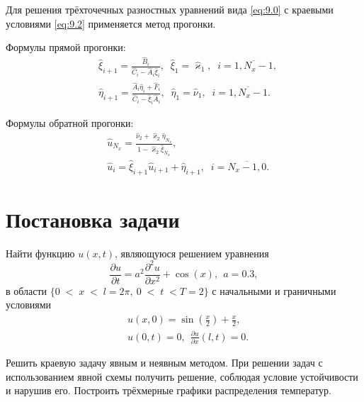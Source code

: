 \documentclass[
11pt,
master, %
subf, %
href, %
colorlinks=true, %
]{disser}
\newcommand*{\PartDif}[2]{\frac{\partial #1}{\partial #2}}
\newcommand*{\PartDiff}[2]{\frac{\partial^2 #1}{\partial #2^2}}
\newcommand*{\Ap}[2]{\hat{#1}_{#2}}
\begin{document}
Для решения трёхточечных разностных уравнений вида \eqref{eq:9.0} с краевыми условиями \eqref{eq:9.2} применяется метод прогонки.

Формулы прямой прогонки:
\begin{align}
        &\Ap{\xi}{i+1} = \frac{\Ap{B}{i}}{\Ap{C}{i} - \Ap{A}{i} \Ap{\xi}{i}},\;\; \Ap{\xi}{1} = \Ap{\varkappa}{1},\;\; i = \overline{1,N_{x} - 1}, \label{eq:11}\\
        &\Ap{\eta}{i+1} = \frac{\Ap{A}{i} \Ap{\eta}{i} + \Ap{F}{i}}{\Ap{C}{i} - \Ap{\xi}{i} \Ap{A}{i}}, \;\; \Ap{\eta}{1} = \Ap{\nu}{1},\;\; i = \overline{1,N_{x} - 1}. \label{eq:12}
\end{align}

Формулы обратной прогонки:
\begin{align}
        &\Ap{u}{N_x} = \frac{\Ap{\nu}{2} + \Ap{\varkappa}{2} \Ap{\eta}{N_{x}}}{1 - \Ap{\varkappa}{2} \Ap{\xi}{N_{x}}}, \label{eq:16}\\
        &\Ap{u}{i} = \Ap{\xi}{i+1} \Ap{u}{i+1} + \Ap{\eta}{i+1}, \;\; i = \overline{N_{x}-1, 0}. \label{eq:17}
\end{align}

\newpage
\section{Постановка задачи}
Найти функцию $u(x,t)$, являющуюся решением уравнения
\begin{equation}\label{eq:18}
  \PartDif{u}{t} = a^2 \PartDiff{u}{x} + \cos(x), ~~ a=0.3,
\end{equation}
в области $\{0\;<\;x\;<\;l=2\pi,~0\;<\;t\;<T=2\}$ с начальными и граничными условиями
\begin{align}
        &u(x,0) = \sin\left(\frac{x}{2}\right) + \frac{x}{2}, \label{eq:19}\\
        &u(0,t) = 0, ~~ \PartDif{u}{x}(l,t) = 0. \label{eq:20}
\end{align}

Решить краевую задачу явным и неявным методом. При решении задач с использованием явной схемы получить решение, соблюдая условие устойчивости и нарушив его. Построить трёхмерные графики распределения температур.
\end{document}
